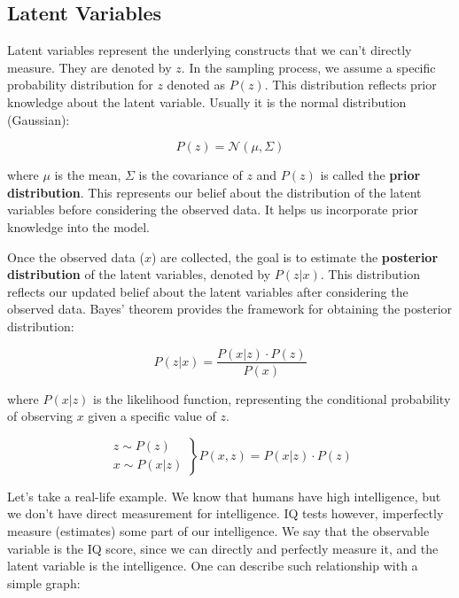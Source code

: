 \subsection{Latent Variables}
\label{appendix:latent_variables}
Latent variables represent the underlying constructs that we can't directly measure. They are denoted by $z$. In the sampling process, we assume a specific probability distribution for $z$ denoted as $P(z)$. This distribution reflects prior knowledge about the latent variable. Usually it is the normal distribution (Gaussian):

\[ P(z) = \mathcal{N} (\mu, \Sigma) \]

where $\mu$ is the mean, $\Sigma$ is the covariance of $z$ and $P(z)$ is called the \textbf{prior distribution}. This represents our belief about the distribution of the latent variables before considering the observed data. It helps us incorporate prior knowledge into the model.

Once the observed data ($x$) are collected, the goal is to estimate the \textbf{posterior distribution} of the latent variables, denoted by $P(z|x)$.  This distribution reflects our updated belief about the latent variables after considering the observed data.  Bayes' theorem provides the framework for obtaining the posterior distribution:

\[ P(z|x) = \frac{P(x|z) \cdot P(z)}{P(x)} \]

where $P(x|z)$ is the likelihood function, representing the conditional probability of observing $x$ given a specific value of $z$.


\begin{equation*}
  \left.\begin{aligned}
  z \sim P(z)\\
  x \sim P(x|z)
\end{aligned}\right\} P(x,z) = P(x|z) \cdot P(z)
\end{equation*}


Let's take a real-life example. We know that humans have high intelligence, but we don't have direct measurement for intelligence. IQ tests however, imperfectly measure (estimates) some part of our intelligence. We say that the observable variable is the IQ score, since we can directly and perfectly measure it, and the latent variable is the intelligence. One can describe such relationship with a simple graph:


